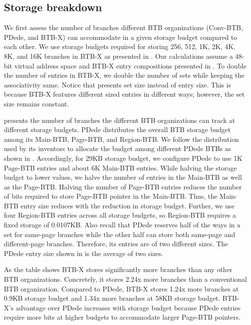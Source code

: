 \subsection{Storage breakdown}
\label{sec:storageBreak}

We first assess the number of branches different BTB organizations (Conv-BTB, PDede, and BTB-X) can accommodate in a given storage budget compared to each other. We use storage budgets required for storing 256, 512, 1K, 2K, 4K, 8K, and 16K branches in BTB-X as presented in . Our calculations assume a 48-bit virtual address space and BTB-X entry compositions presented in . To double the number of entries in BTB-X, we double the number of sets while keeping the associativity same. Notice that  presents set size instead of entry size. This is because BTB-X features different sized entries in different ways; however, the set size remains constant.

 presents the number of branches the different BTB organizations can track at different storage budgets. PDede distributes the overall BTB storage budget among its Main-BTB, Page-BTB, and Region-BTB. We follow the distribution used by its inventors\cite{pdede} to allocate the budget among different PDede BTBs as shown in . Accordingly, for 29KB storage budget, we configure PDede to use 1K Page-BTB entries and about 6K Main-BTB entries. While halving the storage budget to lower values, we halve the number of entries in the Main-BTB as well as the Page-BTB. Halving the number of Page-BTB entries reduces the number of bits required to store Page-BTB pointer in the Main-BTB. Thus, the Main-BTB entry size reduces with the reduction in storage budget. Further, we use four Region-BTB entries across all storage budgets, so Region-BTB requires a fixed storage of 0.0107KB. Also recall that PDede reserves half of the ways in a set for same-page branches while the other half can store both same-page and different-page branches. Therefore, its entries are of two different sizes. The PDede entry size shown in  is the average of two sizes.


As the table shows BTB-X stores significantly more branches than any other BTB organizations. Concretely, it stores 2.24x more branches than a conventional BTB organization. Compared to PDede, BTB-X stores 1.24x more branches at 0.9KB storage budget and 1.34x more branches at 58KB storage budget. BTB-X's advantage over PDede increases with storage budget because PDede entries require more bits at higher budgets to accommodate larger Page-BTB pointers.

